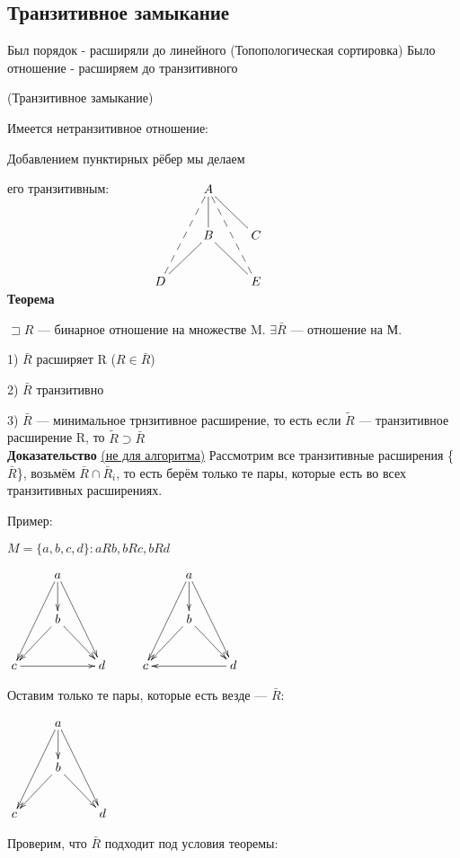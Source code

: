 \documentclass[a4paper, 12pt] {article}
\begin{document}
	\subsection{Транзитивное замыкание}
	
Был порядок - расширяли до линейного (Топопологическая сортировка)
Было отношение - расширяем до транзитивного 

(Транзитивное замыкание)
	
	Имеется нетранзитивное отношение:
	
	Добавлением пунктирных рёбер мы делаем 
	
	его транзитивным:
	$\xymatrix{
		& & A \ar@{-}[d] \ar@{--}[ddl] \ar@{--}[ddr] \ar@{-}[rd]  \\ 
		& & B \ar@{-}[dl] \ar@{-}[dr] & C \\
		& D & & E \\
	}$\\
	
	\textbf{ Теорема}
	
	$\sqsupset R$ --- бинарное отношение на множестве M. $\exists \bar R$ --- отношение на М. 
	
	
	1) $\bar R$ расширяет R ($R \in \bar R$)
	
	2) $\bar R$ транзитивно
	
	3) $\bar R$ --- минимальное трнзитивное расширение, то есть если $\widetilde{R}$ --- транзитивное расширение R, то $\widetilde{R} \supset \bar R$\\
	
	
	\textbf{ Доказательство} \underline{(не для алгоритма)}
	Рассмотрим все транзитивные расширения \{$\bar R$\}, возьмём $\bar R \cap \bar R_{i}$, то есть берём только те пары, которые есть во всех транзитивных расширениях.
	
	Пример:
	
	$ M = \{a, b, c, d\} : aRb, bRc, bRd$
	
	$\xymatrix{
		& a \ar[d] \ar[ddr] \ar[ddl] & & & a \ar[d] \ar[ddr] \ar[ddl] \\
		& b \ar[dl] \ar[dr] & & & b  \ar[dl] \ar[dr]\\
		c \ar[rr] & & d  & c & & d \ar[ll]
	}$
	
	Оставим только те пары, которые есть везде --- $\bar R:$
	
	$\xymatrix{
		& a \ar[d] \ar[ddr] \ar[ddl] \\
		& b \ar[dl] \ar[dr]\\
		c & & d  
	}$
	
	Проверим, что $\bar R$ подходит под условия теоремы:
	
\end{document}
